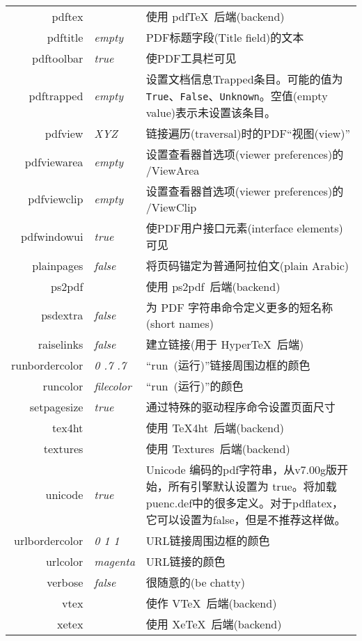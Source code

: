 \documentclass{article}
\begin{document}
\begin{longtable}{@{}>{\ttfamily}rlp{7cm}@{}}
pdftex             &                        & 使用 \textsf{pdf\TeX}\ 后端(backend) \\
pdftitle           & \textit{empty}         & PDF标题字段(Title field)的文本\\
pdftoolbar         & \textit{true}          & 使PDF工具栏可见 \\
pdftrapped         & \textit{empty}         & 设置文档信息Trapped条目。可能的值为 \texttt{True}、\texttt{False}、\texttt{Unknown}。空值(empty value)表示未设置该条目。\\
pdfview            & \textit{XYZ}           & 链接遍历(traversal)时的PDF“视图(view)”\\
pdfviewarea        & \textit{empty}         & 设置查看器首选项(viewer preferences)的 /ViewArea \\
pdfviewclip        & \textit{empty}         & 设置查看器首选项(viewer preferences)的 /ViewClip \\
pdfwindowui        & \textit{true}          & 使PDF用户接口元素(interface elements)可见\\
plainpages         & \textit{false}         & 将页码锚定为普通阿拉伯文(plain Arabic)\\
ps2pdf             &                        & 使用 \textsf{ps2pdf}\ 后端(backend)\\
psdextra           & \textit{false}         & 为 PDF 字符串命令定义更多的短名称(short names)\\
raiselinks         & \textit{false}         & 建立链接(用于 \textsf{Hyper\TeX}\ 后端) \\
runbordercolor     & \textit{0 .7 .7}       & “run~(运行)”链接周围边框的颜色\\
runcolor           & \textit{filecolor}     & “run~(运行)”的颜色\\
setpagesize        & \textit{true}          & 通过特殊的驱动程序命令设置页面尺寸\\
tex4ht             &                        & 使用 \textsf{\TeX4ht}\ 后端(backend) \\
textures           &                        & 使用 \textsf{Textures}\ 后端(backend) \\
unicode            & \textit{true}          & Unicode 编码的pdf字符串，从v7.00g版开始，所有引擎默认设置为 true。将加载puenc.def中的很多定义。对于pdflatex，它可以设置为false，但是不推荐这样做。\\
urlbordercolor     & \textit{0 1 1}         & URL链接周围边框的颜色 \\
urlcolor           & \textit{magenta}       & URL链接的颜色 \\
verbose            & \textit{false}         & 很随意的(be chatty) \\
vtex               &                        & 使作 \textsf{VTeX}\ 后端(backend)\\
xetex              &                        & 使用 \textsf{Xe\TeX}\ 后端(backend)\\
\end{longtable}
\end{document}
